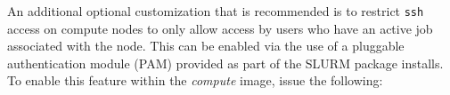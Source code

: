An additional optional customization that is recommended is to
restrict \texttt{ssh} access on compute nodes to only allow access by users who
have an active job associated with the node. This can be enabled via the use of
a pluggable authentication module (PAM) provided as part of the SLURM package
installs. To enable this feature within the {\em compute} image, issue the following:


